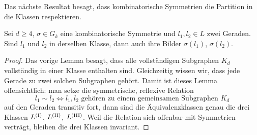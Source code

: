Das nächste Resultat besagt, dass kombinatorische Symmetrien die Partition in die Klassen respektieren.
\begin{lemma}
Sei $d \geq 4$, $\sigma \in G_k$ eine kombinatorische Symmetrie und $l_1, l_2 \in L$ zwei Geraden. Sind $l_1$ und $l_2$ in derselben Klasse, dann auch ihre Bilder $\sigma(l_1)$, $\sigma(l_2)$.
\end{lemma}
\begin{proof}
Das vorige Lemma besagt, dass alle vollständigen Subgraphen $K_d$ vollständig in einer Klasse enthalten sind. Gleichzeitig wissen wir, dass jede Gerade zu zwei solchen Subgraphen gehört. Damit ist dieses Lemma offensichtlich: man setze die symmetrische, reflexive Relation
\begin{equation*}
l_1 \sim l_2 \Longleftrightarrow l_1, l_2 \text{ gehören zu einem gemeinsamen Subgraphen } K_d
\end{equation*}
auf den Geraden transitiv fort, dann sind die Äquivalenzklassen genau die drei Klassen $\Lcl(I)$, $\Lcl(II)$, $\Lcl(III)$. Weil die Relation sich offenbar mit Symmetrien verträgt, bleiben die drei Klassen invariant.
\end{proof}

